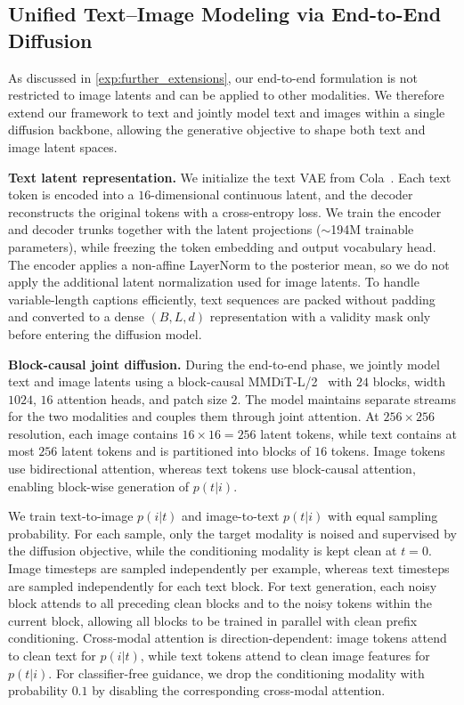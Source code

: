\subsection{Unified Text--Image Modeling via End-to-End Diffusion}
\label{app:mm}

As discussed in \cref{exp:further_extensions}, our end-to-end formulation is not restricted to image latents and can be applied to other modalities.
We therefore extend our framework to text and jointly model text and images within a single diffusion backbone, allowing the generative objective to shape both text and image latent spaces.

\textbf{Text latent representation.}
We initialize the text VAE from Cola~\cite{cola}.
Each text token is encoded into a $16$-dimensional continuous latent, and the decoder reconstructs the original tokens with a cross-entropy loss.
We train the encoder and decoder trunks together with the latent projections ($\sim$194M trainable parameters), while freezing the token embedding and output vocabulary head.
The encoder applies a non-affine LayerNorm to the posterior mean, so we do not apply the additional latent normalization used for image latents.
To handle variable-length captions efficiently, text sequences are packed without padding and converted to a dense $(B,L,d)$ representation with a validity mask only before entering the diffusion model.

\textbf{Block-causal joint diffusion.}
During the end-to-end phase, we jointly model text and image latents using a block-causal MMDiT-L/2~\cite{mmdit} with $24$ blocks, width $1024$, $16$ attention heads, and patch size $2$.
The model maintains separate streams for the two modalities and couples them through joint attention.
At $256\times256$ resolution, each image contains $16\times16=256$ latent tokens, while text contains at most $256$ latent tokens and is partitioned into blocks of $16$ tokens.
Image tokens use bidirectional attention, whereas text tokens use block-causal attention, enabling block-wise generation of $p(t|i)$.

We train text-to-image $p(i|t)$ and image-to-text $p(t|i)$ with equal sampling probability.
For each sample, only the target modality is noised and supervised by the diffusion objective, while the conditioning modality is kept clean at $t=0$.
Image timesteps are sampled independently per example, whereas text timesteps are sampled independently for each text block.
For text generation, each noisy block attends to all preceding clean blocks and to the noisy tokens within the current block, allowing all blocks to be trained in parallel with clean prefix conditioning.
Cross-modal attention is direction-dependent: image tokens attend to clean text for $p(i|t)$, while text tokens attend to clean image features for $p(t|i)$.
For classifier-free guidance, we drop the conditioning modality with probability $0.1$ by disabling the corresponding cross-modal attention.

